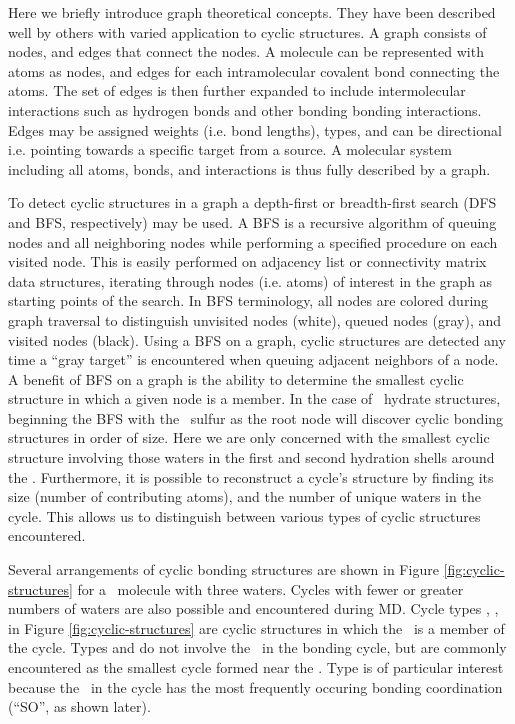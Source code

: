 Here we briefly introduce graph theoretical concepts. They have been described well by others with varied application to cyclic structures.\cite{Tutte1984, Balakrishnan2000, Harary1973, Huber2007, Garcia2004, Dury2001} A graph consists of nodes, and edges that connect the nodes. A molecule can be represented with atoms as nodes, and edges for each intramolecular covalent bond connecting the atoms. The set of edges is then further expanded to include intermolecular interactions such as hydrogen bonds and other bonding bonding interactions. Edges may be assigned weights (i.e. bond lengths), types, and can be directional i.e. pointing towards a specific target from a source. A molecular system including all atoms, bonds, and interactions is thus fully described by a graph. 

To detect cyclic structures in a graph a depth-first or breadth-first search (DFS and BFS, respectively) may be used.\cite{Knuth1997, Cormen 2001} A BFS is a recursive algorithm of queuing nodes and all neighboring nodes while performing a specified procedure on each visited node. This is easily performed on adjacency list or connectivity matrix data structures, iterating through nodes (i.e. atoms) of interest in the graph as starting points of the search. In BFS terminology, all nodes are colored during graph traversal to distinguish unvisited nodes (white), queued nodes (gray), and visited nodes (black). Using a BFS on a graph, cyclic structures are detected any time a ``gray target'' is encountered when queuing adjacent neighbors of a node. A benefit of BFS on a graph is the ability to determine the smallest cyclic structure in which a given node is a member. In the case of \suldiox~hydrate structures, beginning the BFS with the \suldiox~sulfur as the root node will discover cyclic bonding structures in order of size. Here we are only concerned with the smallest cyclic structure involving those waters in the first and second hydration shells around the \suldiox. Furthermore, it is possible to reconstruct a cycle's structure by finding its size (number of contributing atoms), and the number of unique waters in the cycle. This allows us to distinguish between various types of cyclic structures encountered.

Several arrangements of cyclic bonding structures are shown in Figure \ref{fig:cyclic-structures} for a \suldiox~molecule with three waters. Cycles with fewer or greater numbers of waters are also possible and encountered during MD. Cycle types , ,  in Figure \ref{fig:cyclic-structures} are cyclic structures in which the \suldiox~is a member of the cycle. Types  and  do not involve the \suldiox~in the bonding cycle, but are commonly encountered as the smallest cycle formed near the \suldiox. Type  is of particular interest because the \suldiox~in the cycle has the most frequently occuring bonding coordination (``SO'', as shown later).

